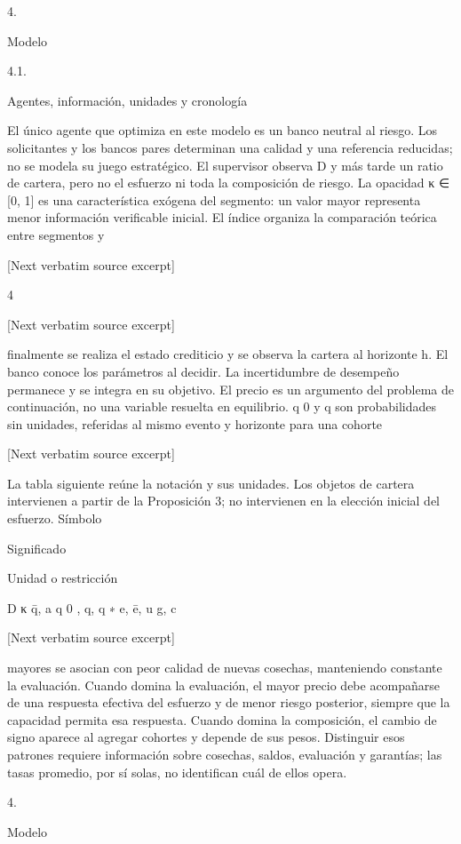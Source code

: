 \documentclass[10pt]{article}
\begin{document}
\begin{ReviewVerbatim}
4.

Modelo

4.1.

Agentes, información, unidades y cronología

El único agente que optimiza en este modelo es un banco neutral al riesgo. Los solicitantes y los
bancos pares determinan una calidad y una referencia reducidas; no se modela su juego estratégico.
El supervisor observa D y más tarde un ratio de cartera, pero no el esfuerzo ni toda la composición de
riesgo. La opacidad κ ∈ [0, 1] es una característica exógena del segmento: un valor mayor representa
menor información veriﬁcable inicial. El índice organiza la comparación teórica entre segmentos y

[Next verbatim source excerpt]


4

[Next verbatim source excerpt]

ﬁnalmente se realiza el estado crediticio y se observa la cartera al horizonte h. El banco conoce los
parámetros al decidir. La incertidumbre de desempeño permanece y se integra en su objetivo. El
precio es un argumento del problema de continuación, no una variable resuelta en equilibrio.
q 0 y q son probabilidades sin unidades, referidas al mismo evento y horizonte para una cohorte

[Next verbatim source excerpt]

La tabla siguiente reúne la notación y sus unidades. Los objetos de cartera intervienen a partir
de la Proposición 3; no intervienen en la elección inicial del esfuerzo.
Símbolo

Signiﬁcado

Unidad o restricción

D
κ
q̄, a
q 0 , q, q ∗
e, ē, u
g, c

[Next verbatim source excerpt]

mayores se asocian con peor calidad de nuevas cosechas, manteniendo constante la evaluación.
Cuando domina la evaluación, el mayor precio debe acompañarse de una respuesta efectiva del
esfuerzo y de menor riesgo posterior, siempre que la capacidad permita esa respuesta. Cuando
domina la composición, el cambio de signo aparece al agregar cohortes y depende de sus pesos.
Distinguir esos patrones requiere información sobre cosechas, saldos, evaluación y garantías; las
tasas promedio, por sí solas, no identiﬁcan cuál de ellos opera.

4.

Modelo


\end{ReviewVerbatim}
\end{document}

